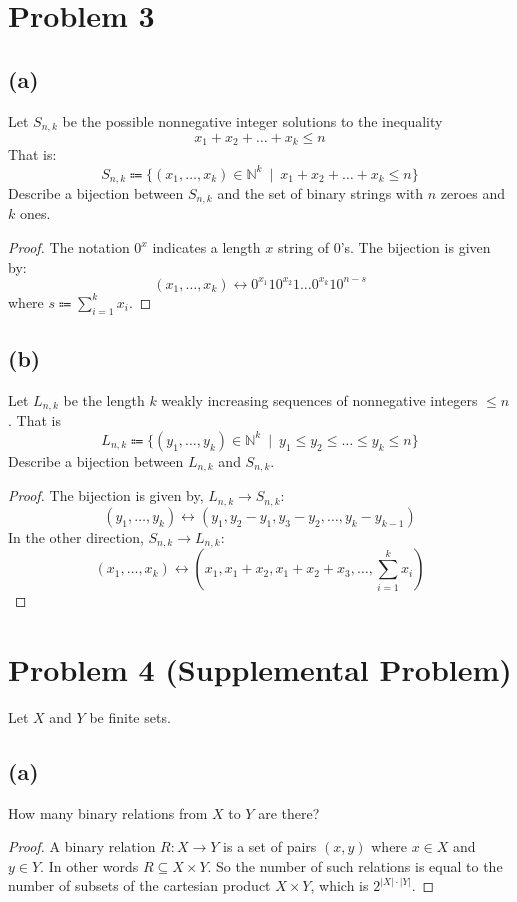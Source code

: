 \documentclass[14pt]{extarticle}
\begin{document}
\section{Problem 3}
\subsection{(a)}
Let $S_{n,k}$ be the possible nonnegative integer solutions to the inequality
$$
x_1 + x_2 + \ldots + x_k \leq n
$$
That is:
$$
S_{n,k} \Coloneqq \{(x_1, \ldots, x_k) \in \mathbb{N}^k\,\,\,|\,\,\,x_1 + x_2 + \ldots + x_k \leq n\}
$$
Describe a bijection between $S_{n,k}$ and the set of binary strings with $n$ zeroes and $k$ ones.
\begin{proof}
The notation $0^x$ indicates a length $x$ string of 0’s. The bijection is given by:
$$
(x_1, \ldots, x_k) \longleftrightarrow 0^{x_1}10^{x_2}1\ldots0^{x_k}10^{n-s}
$$
where $s \Coloneqq \sum_{i=1}^{k}x_i$.
\end{proof}

\subsection{(b)}
Let $L_{n,k}$ be the length $k$ weakly increasing sequences of nonnegative integers $ \leq n$. That is
$$
L_{n,k} \Coloneqq \{(y_1, \ldots, y_k) \in \mathbb{N}^k\,\,\,|\,\,\,y_1 \leq y_2 \leq \ldots \leq y_k \leq n\}
$$
Describe a bijection between $L_{n,k}$ and $S_{n,k}$.
\begin{proof}
The bijection is given by, $L_{n,k} \to S_{n,k}$:
$$
(y_1, \ldots, y_k) \longleftrightarrow (y_1, y_2 - y_1, y_3 - y_2, \ldots, y_k - y_{k-1})
$$
In the other direction, $S_{n,k} \to L_{n,k}$:
$$
(x_1, \ldots, x_k) \longleftrightarrow (x_1, x_1+x_2, x_1+x_2+x_3, \ldots, \sum_{i=1}^{k}x_i)
$$
\end{proof}

\section{Problem 4 (Supplemental Problem)}
Let $X$ and $Y$ be finite sets.

\subsection{(a)}
How many binary relations from $X$ to $Y$ are there?

\begin{proof}
A binary relation $R: X \to Y$ is a set of pairs $(x,y)$ where $x \in X$ and $y \in Y$. In other words $R \subseteq X \times Y$. So the number of such relations is equal to the number of subsets of the cartesian product $X \times Y$, which is $2^{|X|\cdot|Y|}$.
\end{proof}
\end{document}
